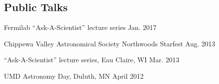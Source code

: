 \documentclass[11pt]{cv}
\begin{document}
\begin{cv}


\section{Public Talks}
\begin{etaremune}
  \item Fermilab ``Ask-A-Scientist'' lecture series \hfill Jan. 2017
  \item Chippewa Valley Astronomical Society Northwoods Starfest \hfill Aug. 2013
  \item ``Ask-A-Scientist'' lecture series, Eau Claire, WI \hfill Mar. 2013
  \item UMD Astronomy Day, Duluth, MN \hfill April 2012
\end{etaremune}



\end{cv}
\end{document}

